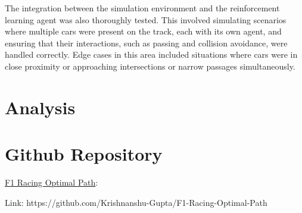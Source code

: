 \documentclass[12pt]{article}
\begin{document}
The integration between the simulation environment and the reinforcement 
learning agent was also thoroughly tested. This involved simulating scenarios 
where multiple cars were present on the track, each with its own agent, and 
ensuring that their interactions, such as passing and collision avoidance, were 
handled correctly. Edge cases in this area included situations where cars were 
in close proximity or approaching intersections or narrow passages 
simultaneously.

\section{Analysis}

\section{Github Repository}
\href{https://github.com/Krishnanshu-Gupta/F1-Racing-Optimal-Path}{F1 Racing 
Optimal Path}:

Link: https://github.com/Krishnanshu-Gupta/F1-Racing-Optimal-Path
\end{document}
